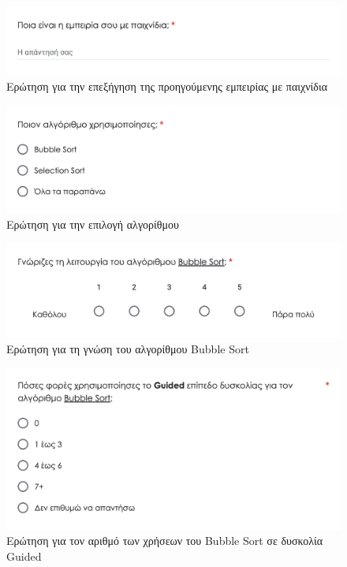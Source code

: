 \begin{figure}[H]
    \centering
    \includegraphics[width=0.8\linewidth]{sections/appendices/b/images/survey_game_experience_input}
    \caption{Ερώτηση για την επεξήγηση της προηγούμενης εμπειρίας με παιχνίδια}
    \label{fig:survey_game_experience_input}
\end{figure}


\begin{figure}[H]
    \centering
    \includegraphics[width=0.8\linewidth]{sections/appendices/b/images/survey_algorithm_selection}
    \caption{Ερώτηση για την επιλογή αλγορίθμου}
    \label{fig:survey_algorithm_selection}
\end{figure}


\begin{figure}[H]
    \centering
    \includegraphics[width=0.8\linewidth]{sections/appendices/b/images/survey_bubblesort_knowledge}
    \caption{Ερώτηση για τη γνώση του αλγορίθμου Bubble Sort}
    \label{fig:survey_bubblesort_knowledge}
\end{figure}

\begin{figure}[H]
    \centering
    \includegraphics[width=0.8\linewidth]{sections/appendices/b/images/survey_bubblesort_guided_usages}
    \caption{Ερώτηση για τον αριθμό των χρήσεων του Bubble Sort σε δυσκολία Guided}
    \label{fig:survey_bubblesort_guided_usages}
\end{figure}

